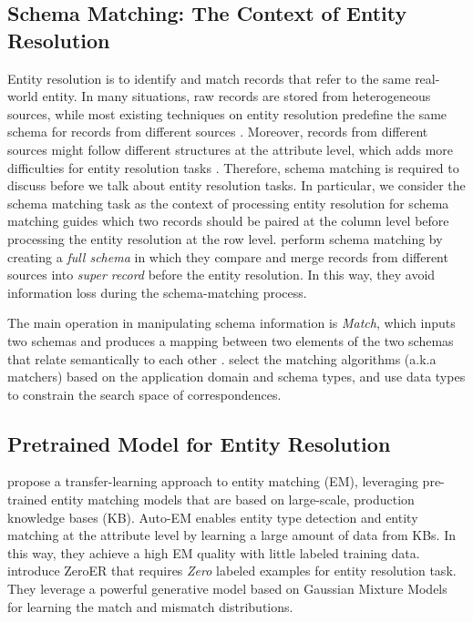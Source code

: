 \subsection{Schema Matching: The Context of Entity Resolution}
Entity resolution is to identify and match records that refer to the same real-world entity. In many situations, raw records are stored from heterogeneous sources, while most existing techniques on entity resolution predefine the same schema for records from different sources \cite{elmagarmid_duplicate_2007}. Moreover, records from different sources might follow different structures at the attribute level, which adds more difficulties for entity resolution tasks \cite{enriquez_entity_2017, arabnia_when_2021}. Therefore, schema matching is required to discuss before we talk about entity resolution tasks. In particular, we consider the schema matching task as the context of processing entity resolution for schema matching guides which two records should be paired at the column level before processing the entity resolution at the row level. \cite{lin_efficient_2020} perform schema matching by creating a \textit{full schema} in which they compare and merge records from different sources into \textit{super record} before the entity resolution. In this way, they avoid information loss during the schema-matching process.

The main operation in manipulating schema information is \textit{Match}, which inputs two schemas and produces a mapping between two elements of the two schemas that relate semantically to each other \cite{rahm_survey_2001}. \cite{rahm_survey_2001} select the matching algorithms (a.k.a matchers) based on the application domain and schema types, and use data types to constrain the search space of correspondences. 

\subsection{Pretrained Model for Entity Resolution}

\cite{zhao_auto-em_2019} propose a transfer-learning approach to entity matching (EM), leveraging pre-trained entity matching models that are based on large-scale, production knowledge bases (KB). Auto-EM enables entity type detection and entity matching at the attribute level by learning a large amount of data from KBs. In this way, they achieve a high EM quality with little labeled training data. \cite{wu_zeroer_2020} introduce ZeroER that requires \textit{Zero} labeled examples for entity resolution task. They leverage a powerful generative model based on Gaussian Mixture Models for learning the match and mismatch distributions. 

